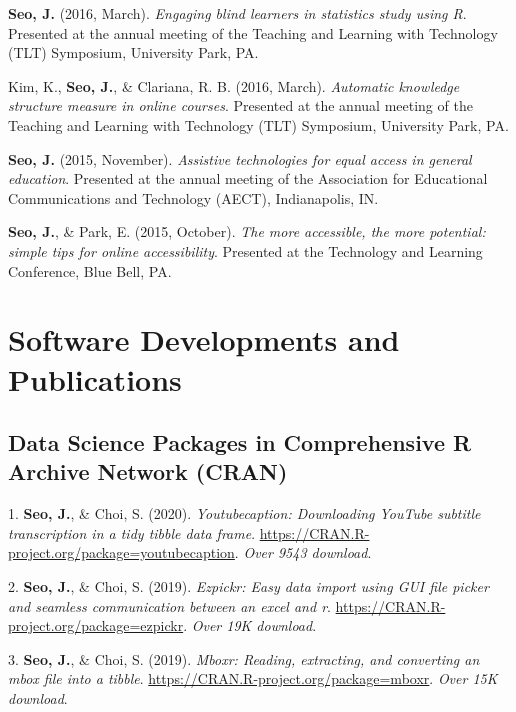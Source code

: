 \documentclass[11pt,a4paper,]{awesome-cv}
\begin{document}
\textbf{Seo, J.} (2016, March). \emph{Engaging blind learners in
statistics study using R}. Presented at the annual meeting of the
Teaching and Learning with Technology (TLT) Symposium, University Park,
PA.

Kim, K., \textbf{Seo, J.}, \& Clariana, R. B. (2016, March).
\emph{Automatic knowledge structure measure in online courses}.
Presented at the annual meeting of the Teaching and Learning with
Technology (TLT) Symposium, University Park, PA.

\textbf{Seo, J.} (2015, November). \emph{Assistive technologies for
equal access in general education}. Presented at the annual meeting of
the Association for Educational Communications and Technology (AECT),
Indianapolis, IN.

\textbf{Seo, J.}, \& Park, E. (2015, October). \emph{The more
accessible, the more potential: simple tips for online accessibility}.
Presented at the Technology and Learning Conference, Blue Bell, PA.

\hypertarget{software-developments-and-publications}{%
\section{Software Developments and
Publications}\label{software-developments-and-publications}}

\hypertarget{data-science-packages-in-comprehensive-r-archive-network-cran}{%
\subsection{Data Science Packages in Comprehensive R Archive Network
(CRAN)}\label{data-science-packages-in-comprehensive-r-archive-network-cran}}

\hypertarget{bibliography}{}
\leavevmode{}%
1. \textbf{Seo, J.}, \& Choi, S. (2020). \emph{Youtubecaption:
Downloading YouTube subtitle transcription in a tidy tibble data frame}.
\url{https://CRAN.R-project.org/package=youtubecaption}. \emph{Over 9543
download}.

\leavevmode{}%
2. \textbf{Seo, J.}, \& Choi, S. (2019). \emph{Ezpickr: Easy data import
using GUI file picker and seamless communication between an excel and
r}. \url{https://CRAN.R-project.org/package=ezpickr}. \emph{Over 19K
download}.

\leavevmode{}%
3. \textbf{Seo, J.}, \& Choi, S. (2019). \emph{Mboxr: Reading,
extracting, and converting an mbox file into a tibble}.
\url{https://CRAN.R-project.org/package=mboxr}. \emph{Over 15K
download}.
\end{document}
